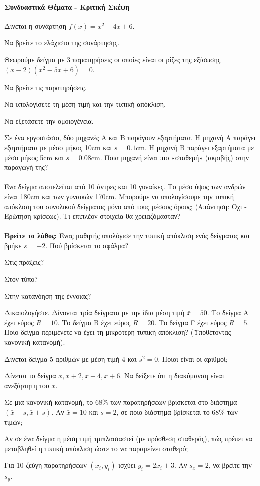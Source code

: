 \documentclass[11pt,a4paper,modern]{FFExercises}
\begin{document}
\paragraph{Συνδυαστικά Θέματα - Κριτική Σκέψη}

\askhsh
Δίνεται η συνάρτηση $f(x) = x^2 - 4x + 6$.
\begin{alist}
    \item Να βρείτε το ελάχιστο της συνάρτησης.
    \item Θεωρούμε δείγμα με 3 παρατηρήσεις οι οποίες είναι οι ρίζες της εξίσωσης $(x-2)(x^2 - 5x + 6) = 0$.
    \begin{alist}
        \item Να βρείτε τις παρατηρήσεις.
        \item Να υπολογίσετε τη μέση τιμή και την τυπική απόκλιση.
        \item Να εξετάσετε την ομοιογένεια.
    \end{alist}
\end{alist}

\askhsh
Σε ένα εργοστάσιο, δύο μηχανές Α και Β παράγουν εξαρτήματα.
Η μηχανή Α παράγει εξαρτήματα με μέσο μήκος 10\si{cm} και $s=0.1$\si{cm}.
Η μηχανή Β παράγει εξαρτήματα με μέσο μήκος 5\si{cm} και $s=0.08$\si{cm}.
Ποια μηχανή είναι πιο «σταθερή» (ακριβής) στην παραγωγή της?\\\\
\askhsh
Ένα δείγμα αποτελείται από 10 άντρες και 10 γυναίκες.
Το μέσο ύψος των ανδρών είναι 180\si{cm} και των γυναικών 170\si{cm}.
Μπορούμε να υπολογίσουμε την τυπική απόκλιση του συνολικού δείγματος μόνο από τους μέσους όρους; (Απάντηση: Όχι - Ερώτηση κρίσεως).
Τι επιπλέον στοιχεία θα χρειαζόμασταν?\\\\
\askhsh
\textbf{Βρείτε το λάθος:}
Ένας μαθητής υπολόγισε την τυπική απόκλιση ενός δείγματος και βρήκε $s = -2$.
Πού βρίσκεται το σφάλμα?
\begin{alist}
    \item Στις πράξεις?
    \item Στον τύπο?
    \item Στην κατανόηση της έννοιας?
\end{alist}
Δικαιολογήστε.
\askhsh
Δίνονται τρία δείγματα με την ίδια μέση τιμή $\bar{x} = 50$.
Το δείγμα Α έχει εύρος $R=10$.
Το δείγμα Β έχει εύρος $R=20$.
Το δείγμα Γ έχει εύρος $R=5$.
Ποιο δείγμα περιμένετε να έχει τη μικρότερη τυπική απόκλιση? (Υποθέτοντας κανονική κατανομή).

\askhsh
Δίνεται δείγμα 5 αριθμών με μέση τιμή 4 και $s^2=0$.
Ποιοι είναι οι αριθμοί;

\askhsh
Δίνεται το δείγμα $x, x+2, x+4, x+6$.
Να δείξετε ότι η διακύμανση είναι ανεξάρτητη του $x$.

\askhsh
Σε μια κανονική κατανομή, το $68\%$ των παρατηρήσεων βρίσκεται στο διάστημα $(\bar{x}-s, \bar{x}+s)$.
Αν $\bar{x}=10$ και $s=2$, σε ποιο διάστημα βρίσκεται το $68\%$ των τιμών;

\askhsh
Αν σε ένα δείγμα η μέση τιμή τριπλασιαστεί (με πρόσθεση σταθεράς), πώς πρέπει να μεταβληθεί η τυπική απόκλιση ώστε το  να παραμείνει σταθερό;

\askhsh
Για 10 ζεύγη παρατηρήσεων $(x_i, y_i)$ ισχύει $y_i = 2x_i + 3$.
Αν $s_x = 2$, να βρείτε την $s_y$.
\end{document}

